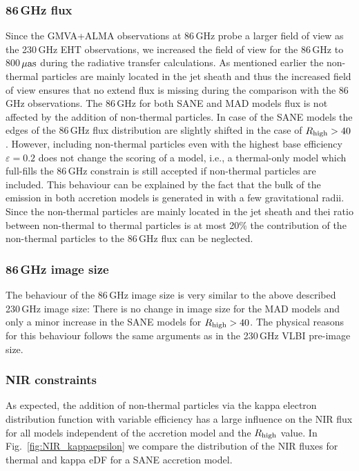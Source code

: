 \subsubsection{86\,GHz flux}
Since the GMVA+ALMA observations at 86\,GHz  probe a larger field of view as the 230\,GHz EHT observations, we increased the field of view for the 86\,GHz to 800\,$\rm{\mu as}$ during the radiative transfer calculations. As mentioned earlier the non-thermal particles are mainly located in the jet sheath and thus the increased field of view ensures that no extend flux is missing during the comparison with the 86\,GHz observations.
\newline The 86\,GHz for both SANE and MAD models flux is not affected by the addition of non-thermal particles. In case of the SANE models the edges of the 86\,GHz flux distribution are slightly shifted in the case of $R_{\rm high}>40$. However, including non-thermal particles even with the highest base efficiency $\varepsilon=0.2$ does not change the scoring of a model, i.e., a thermal-only model which full-fills the 86\,GHz constrain is still accepted if non-thermal particles are included. This behaviour can be explained by the fact that the bulk of the emission in both accretion models is generated in with a few gravitational radii. Since the non-thermal particles are mainly located in the jet sheath and thei ratio between non-thermal to thermal particles is at most 20\% the contribution of the non-thermal particles to the 86\,GHz flux can be neglected.


\subsubsection{86\,GHz image size}
The behaviour of the 86\,GHz image size is very similar to the above described 230\,GHz image size: There is no change in image size for the MAD models and only a minor increase in the SANE models for $R_{\rm high}>40$. The physical reasons for this behaviour follows the same arguments as in the 230\,GHz VLBI pre-image size.

\subsubsection{NIR constraints}
As expected, the addition of non-thermal particles via the kappa electron distribution function with variable efficiency has a large influence on the NIR flux for all models independent of the accretion model and the $R_{\rm high}$ value. In Fig.~\ref{fig:NIR_kappaepsilon} we compare the distribution of the NIR fluxes for thermal and kappa eDF for a SANE accretion model.


